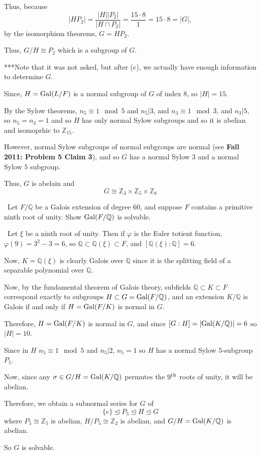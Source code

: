 \documentclass[12pt]{Qual}
\begin{document}
\begin{solution}
\begin{enumerate}[label=(\alph*)]
    Thus, because $$|HP_2|=\frac{|H||P_2|}{|H\cap P_2|}=\frac{15\cdot 8}{1}=15\cdot 8=|G|,$$ by the isomorphism theorems, $G=HP_2.$

    Thus, $G/H\cong P_2$ which is a subgroup of $G$.
\end{enumerate}
\begin{mybox}
***Note that it was not asked, but after (c), we actually have enough information to determine $G.$

Since, $H=\text{Gal}(L/F)$ is a normal subgroup of $G$ of index $8$, so $|H|=15$.

By the Sylow theorems, $n_5\equiv 1\mod 5$ and $n_5|3$, and $n_3\equiv 1\mod 3$, and $n_3|5$, so $n_5=n_3=1$ and so $H$ has only normal Sylow subgroups and so it is abelian and isomoprhic to $\mathbb{Z}_{15}.$

However, normal Sylow subgroups of normal subgroups are normal (see \textbf{Fall 2011: Problem 5 Claim 3}), and so $G$ has a normal Sylow $3$ and a normal Sylow $5$ subgroup.

Thus, $G$ is abelain and $$G\cong\mathbb{Z}_3\times\mathbb{Z}_5\times\mathbb{Z}_8$$
\end{mybox}
\end{solution}
\newpage




\begin{problem} $\,$
Let $F/\mathbb{Q}$ be a Galois extension of degree $60$, and suppose $F$ contains a primitive ninth root of unity. Show $\text{Gal}(F/\mathbb{Q})$ is solvable.
\end{problem}


\begin{solution}$\,$
Let $\xi$ be a ninth root of unity. Then if $\varphi$ is the Euler totient function, $\varphi(9)=3^2-3=6$, so $\mathbb{Q}\subset \mathbb{Q}(\xi)\subset F$, and $[\mathbb{Q}(\xi):\mathbb{Q}]=6.$

Now, $K=\mathbb{Q}(\xi)$ is clearly Galois over $\mathbb{Q}$ since it is the splitting field of a separable polynomial over $\mathbb{Q}$.

Now, by the fundamental theorem of Galois theory, subfields $\mathbb{Q}\subset K\subset F$ correspond exactly to subgroups $H\subset G=\text{Gal}(F/\mathbb{Q})$, and an extension $K/\mathbb{Q}$ is Galois if and only if $H=\text{Gal}(F/K)$ is normal in $G$.

Therefore, $H=\text{Gal}(F/K)$ is normal in $G$, and since $[G:H]=|\text{Gal}(K/\mathbb{Q})|=6$ so $|H|=10$.

Since in $H$ $n_5\equiv 1\mod 5$ and $n_5|2$, $n_5=1$ so $H$ has a normal Sylow $5$-subgroup $P_5$.

Now, since any $\sigma\in G/H=\text{Gal}(K/\mathbb{Q})$ permutes the $9^\text{th}$ roots of unity, it will be abelian.

Therefore, we obtain a subnormal series for $G$ of $$\{e\}\trianglelefteq P_5\trianglelefteq H\trianglelefteq G$$ where $P_5\cong\mathbb{Z}_5$ is abelian, $H/P_5\cong\mathbb{Z}_2$ is abelian, and $G/H=\text{Gal}(K/\mathbb{Q})$ is abelian.

So $G$ is solvable.

\end{solution}
\newpage
\end{document}
